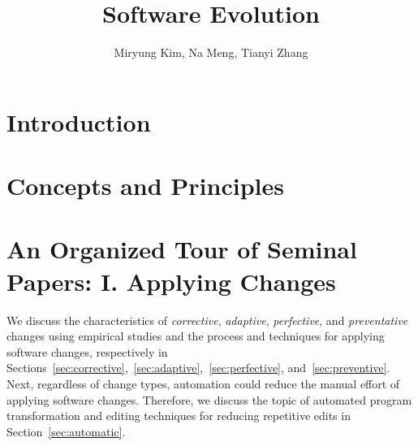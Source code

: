 \documentclass[runningheads,a4paper]{llncs}
\begin{document}
\mainmatter  %

\title{Software Evolution} 


%
%
\author{Miryung Kim, Na Meng, Tianyi Zhang} 

\institute{} 

\maketitle

\begin{abstract}

\end{abstract}

\section{Introduction}


\section{Concepts and Principles}
\label{sec:concepts}
\label{sec:classification} 


\section{An Organized Tour of Seminal Papers: I. Applying Changes}
\label{sec:apply}

We discuss the characteristics of {\em corrective}, {\em adaptive}, {\em perfective}, and {\em preventative} changes using empirical studies and the process and techniques for applying software changes, respectively in Sections~\ref{sec:corrective},~\ref{sec:adaptive},~\ref{sec:perfective}, and~\ref{sec:preventive}. Next, regardless of change types, automation could reduce the manual effort of applying software changes. Therefore, we discuss the topic of automated program transformation and editing techniques for reducing repetitive edits in Section~\ref{sec:automatic}.
\end{document}
